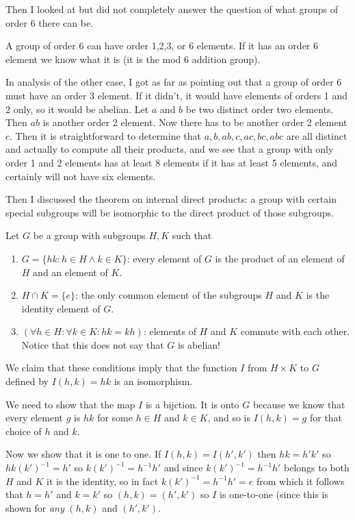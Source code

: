 \documentclass[12pt]{article}
\begin{document}
Then I looked at but did not completely answer the question of what groups of order 6 there can be.

A group of order 6 can have order 1,2,3, or 6 elements.  If it has an order 6 element we know what it is (it is the mod 6 addition group).

In analysis of the other case, I got as far as pointing out that a group of order 6 must have an order 3 element.
If it didn't, it would have elements of orders 1 and 2 only, so it would be abelian.  Let $a$ and $b$ be two distinct order two elements.  Then $ab$ is another order 2 element.  Now there has to be another order 2 element $c$.  Then it is straightforward to determine that $a,b,ab,c,ac,bc,abc$ are all distinct and actually to compute all their products, and we see that a group with only order 1 and 2 elements has at least 8 elements if it has at least 5 elements, and certainly will not have six elements.

Then I discussed the theorem on internal direct products:  a group with certain special subgroups will be isomorphic to the direct product of those subgroups.

Let $G$ be a group with subgroups $H,K$ such that 

\begin{enumerate}

\item  $G = \{hk:h \in H \wedge k \in K\}$:  every element of $G$ is the product of an element of $H$ and an element of $K$.

\item $H \cap K = \{e\}$:  the only common element of the subgroups $H$ and $K$ is the identity element of $G$.

\item $(\forall h \in H:\forall k \in K:hk=kh)$:  elements of $H$ and $K$ commute with each other.  Notice that
this does not say that $G$ is abelian!

\end{enumerate}

We claim that these conditions imply that the function $I$ from $H \times K$ to $G$ defined by $I(h,k) = hk$ is
an isomorphism.

We need to show that the map $I$ is a bijction.  It is onto $G$ because we know that every element $g$ is $hk$ for
some $h \in H$ and $k \in K$, and so is $I(h,k) = g$ for that choice of $h$ and $k$.

Now we show that it is one to one.  If $I(h,k)=I(h',k')$ then $hk = h'k'$ so $hk(k')^{-1} = h'$ so $k(k')^{-1}= h^{-1}h'$ and since $k(k')^{-1}= h^{-1}h'$ belongs to both $H$ and $K$ it is the identity, so in fact $k(k')^{-1}= h^{-1}h'= e$ from which it follows that $h=h'$ and $k=k'$ so $(h,k)=(h',k')$ so $I$ is one-to-one (since this is shown for {\em any\/} $(h,k)$ and $(h',k')$.
\end{document}
